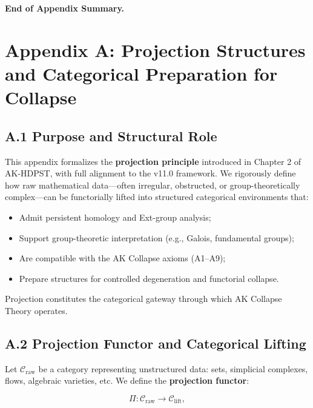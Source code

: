 \documentclass[11pt]{article}
\begin{document}
\vspace{1em}
\textbf{End of Appendix Summary.}



\appendix
\section*{Appendix A: Projection Structures and Categorical Preparation for Collapse}

\subsection*{A.1 Purpose and Structural Role}

This appendix formalizes the \textbf{projection principle} introduced in Chapter 2 of AK-HDPST, with full alignment to the v11.0 framework. We rigorously define how raw mathematical data—often irregular, obstructed, or group-theoretically complex—can be functorially lifted into structured categorical environments that:

\begin{itemize}
    \item Admit persistent homology and Ext-group analysis;
    \item Support group-theoretic interpretation (e.g., Galois, fundamental groups);
    \item Are compatible with the AK Collapse axioms (A1–A9);
    \item Prepare structures for controlled degeneration and functorial collapse.
\end{itemize}

Projection constitutes the categorical gateway through which AK Collapse Theory operates.

\subsection*{A.2 Projection Functor and Categorical Lifting}

Let \( \mathcal{C}_{\mathrm{raw}} \) be a category representing unstructured data: sets, simplicial complexes, flows, algebraic varieties, etc. We define the \textbf{projection functor}:

\[
\Pi : \mathcal{C}_{\mathrm{raw}} \longrightarrow \mathcal{C}_{\mathrm{lift}},
\]
\end{document}
